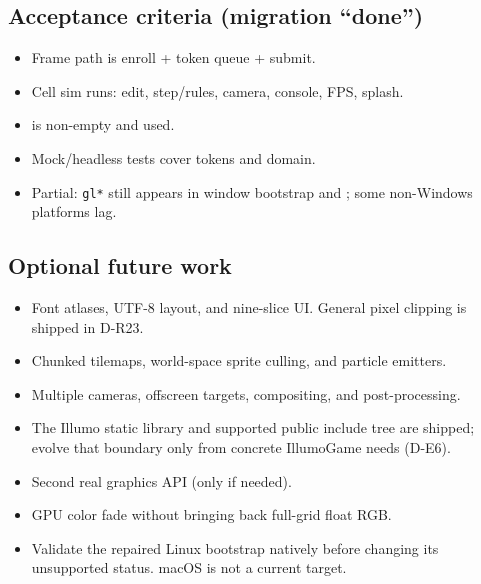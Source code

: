 \subsection{Acceptance criteria (migration ``done'')}
\begin{itemize}
  \item[\checkmark] Frame path is enroll + token queue + submit.
  \item[\checkmark] Cell sim runs: edit, step/rules, camera, console, FPS, splash.
  \item[\checkmark]  is non-empty and used.
  \item[\checkmark] Mock/headless tests cover tokens and domain.
  \item Partial: \texttt{gl*} still appears in window bootstrap and
        ; some non-Windows platforms lag.
\end{itemize}

\subsection{Optional future work}
\begin{itemize}
  \item Font atlases, UTF-8 layout, and nine-slice UI. General pixel clipping
        is shipped in D-R23.
  \item Chunked tilemaps, world-space sprite culling, and particle emitters.
  \item Multiple cameras, offscreen targets, compositing, and post-processing.
  \item The Illumo static library and supported public include tree are shipped;
        evolve that boundary only from concrete IllumoGame needs (D-E6).
  \item Second real graphics API (only if needed).
  \item GPU color fade without bringing back full-grid float RGB.
  \item Validate the repaired Linux bootstrap natively before changing its
        unsupported status. macOS is not a current target.
\end{itemize}
